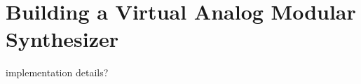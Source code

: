 \chapter[Modular Synthesizer]{Building a Virtual Analog Modular Synthesizer}\label{mod-synth}

implementation details?